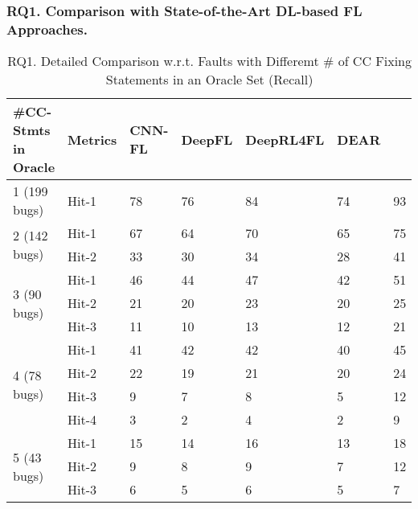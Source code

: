 \subsubsection{\bf RQ1. Comparison with State-of-the-Art DL-based FL Approaches.}
\label{sec:rq1-result}

\begin{table}[t]
	\caption{RQ1. Detailed Comparison w.r.t. Faults with Differemt \# of CC Fixing Statements in an Oracle Set (Recall)}
	\vspace{-10pt}
        \tabcolsep 2pt
	{\footnotesize
		\begin{center}
			\renewcommand{\arraystretch}{1}
			\begin{tabular}{p{1.3cm}<{\centering}|p{0.8cm}<{\centering}|p{1cm}<{\centering}|p{0.8cm}<{\centering}|p{1.3cm}<{\centering}|p{1cm}<{\centering}|p{1.3cm}<{\centering}}
				\hline
				\#CC-Stmts in Oracle & Metrics & CNN-FL & DeepFL & DeepRL4FL & DEAR & \tool \\
				\hline
				\multirow{1}{*}{1 (199 bugs)}   & Hit-1  & 78 & 76 & 84 & 74& 93 \\
				\hline
				\multirow{2}{*}{2 (142 bugs)}  & Hit-1   & 67 & 64 & 70 &65 & 75 \\
				& Hit-2         & 33 & 30 & 34 &28 & 41 \\
				\hline
				\multirow{3}{*}{3 (90 bugs)}  & Hit-1    & 46 & 44 & 47 &42 & 51 \\
				& Hit-2     & 21 & 20 & 23 & 20& 25\\
				& Hit-3     & 11 &10 & 13 &12 & 21 \\
				\hline
				\multirow{4}{*}{4 (78 bugs)}  & Hit-1    & 41 & 42 & 42 &40 & 45 \\
				& Hit-2     &22 & 19 & 21 &20 & 24 \\
				& Hit-3     & 9 & 7 & 8 &5 & 12 \\
				& Hit-4     & 3 & 2 & 4 &2 & 9 \\
				\hline
				\multirow{5}{*}{5 (43 bugs)}  & Hit-1    & 15 & 14 & 16 &13 & 18 \\
				& Hit-2     & 9 & 8 & 9 &7 & 12 \\
				& Hit-3     & 6 & 5 & 6 &5 & 7 \\

\end{tabular}
\end{center}}
\end{table}
